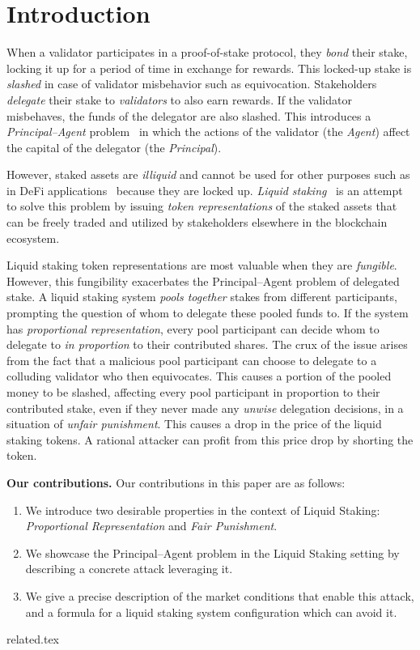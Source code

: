 \section{Introduction}

When a validator participates in a proof-of-stake
protocol, they \emph{bond} their stake, locking it up for a period of time
in exchange for rewards.
This locked-up stake is \emph{slashed} in case of validator misbehavior
such as equivocation.
Stakeholders \emph{delegate} their stake to \emph{validators} to also
earn rewards. If the validator misbehaves,
the funds of the delegator are also slashed. This introduces a
\emph{Principal--Agent} problem~\cite{jensen1976,wealthofnations}
in which the actions of the validator (the \emph{Agent})
affect the capital of the delegator (the \emph{Principal}).

However, staked assets are \emph{illiquid} and cannot be used for
other purposes such as in DeFi applications~\cite{defi-sok}
because they are locked up.
\emph{Liquid staking}~\cite{liquid-staking-report}
is an attempt to solve this problem by issuing
\emph{token representations} of the staked assets that can be freely traded
and utilized by stakeholders elsewhere in the blockchain ecosystem.

Liquid staking token representations are most valuable when they are
\emph{fungible}. However, this fungibility exacerbates the Principal--Agent
problem of delegated stake.
A liquid staking system \emph{pools together} stakes from different participants,
prompting the question of whom to delegate these pooled funds to.
If the system has \emph{proportional representation}, every pool participant
can decide whom to delegate to \emph{in proportion} to their contributed shares.
The crux of the issue arises from the fact
that a malicious pool participant can choose to delegate to
a colluding validator who then equivocates. This causes a portion
of the pooled money to be slashed, affecting every pool participant
in proportion to their contributed stake, even if they never made
any \emph{unwise} delegation decisions, in a situation of
\emph{unfair punishment}. This causes a drop in the price of the
liquid staking tokens. A rational attacker can profit from this price
drop by shorting the token.

\noindent
\textbf{Our contributions.} Our contributions in this paper are as follows:
\begin{enumerate}
    \item We introduce two desirable properties in the context of Liquid Staking:
          \emph{Proportional Representation} and \emph{Fair Punishment}.
    \item We showcase the Principal--Agent problem in the Liquid Staking
          setting by describing a concrete attack leveraging it.
    \item We give a precise description of the market conditions that enable
          this attack, and a formula for a liquid staking system configuration
          which can avoid it.
\end{enumerate}

{related.tex}
